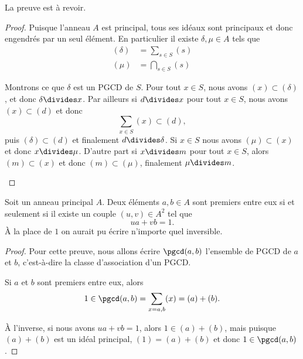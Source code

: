 \begin{probleme}
	La preuve est à revoir.     %
\end{probleme}

\begin{proof}
	Puisque l'anneau \( A\) est principal, tous ses idéaux sont principaux et donc engendrés par un seul élément. En particulier il existe \( \delta,\mu\in A\) tels que
	\begin{subequations}
		\begin{align}
			(\delta) & =  \sum_{s\in S}(s)    \\
			(\mu)    & =  \bigcap_{s\in S}(s)
		\end{align}
	\end{subequations}
	\begin{subproof}
		\spitem[PGCD]
		Montrons ce que \( \delta\) est un PGCD de \( S\). Pour tout \( x\in S\), nous avons \( (x)\subset (\delta)\), et donc \( \delta\divides x\). Par ailleurs si \( d\divides x\) pour tout \( x\in S\), nous avons \( (x)\subset (d)\) et donc
		\begin{equation}
			\sum_{x\in S}(x)\subset (d),
		\end{equation}
		puis \( (\delta)\subset (d)\) et finalement \( d\divides \delta\).
		\spitem[PPCM]
		Si \( x\in S\) nous avons \( (\mu)\subset (x)\) et donc \( x\divides \mu\). D'autre part si \( x\divides m\) pour tout \( x\in S\), alors \( (m)\subset (x)\) et donc \( (m)\subset(\mu)\), finalement \( \mu\divides m\).
	\end{subproof}
\end{proof}

\begin{corollary}\label{CorimHyXy}
	Soit un anneau principal \( A\). Deux éléments \( a,b\in A\) sont premiers entre eux si et seulement si il existe un couple \( (u, v)\in A^2 \) tel que
	\begin{equation}
		ua+vb=1.
	\end{equation}
	À la place de \( 1\) on aurait pu écrire n'importe quel inversible.
\end{corollary}

\begin{proof}
	Pour cette preuve, nous allons écrire \( \pgcd(a,b)\) l'ensemble de PGCD de \( a\) et \( b\), c'est-à-dire la classe d'association d'un PGCD.

	Si \( a\) et \( b\) sont premiers entre eux, alors
	\begin{equation}
		1\in\pgcd(a,b)=\sum_{x=a,b}(x)=(a)+(b).
	\end{equation}

	À l'inverse, si nous avons \( ua+vb=1\), alors \( 1\in (a)+(b)\), mais puisque \( (a)+(b)\) est un idéal principal, \( (1)=(a)+(b)\) et donc \( 1\in \pgcd(a,b)\).
\end{proof}

